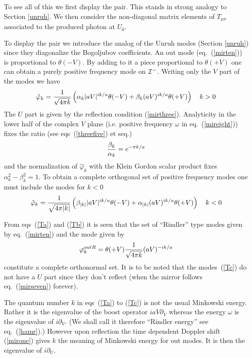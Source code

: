 \documentclass[12pt,oneside]{report}
\def\om{\omega	}
\begin{document}
To see all of this we first display the pair. This stands in strong analogy to
Section \ref{unruh}. We then consider the non-diagonal matrix elements of $
T_{\mu \nu}$ associated to the produced photon at $U_0$.

To display the pair we introduce the analog of the
Unruh modes (Section \ref{unruh}) since they diagonalize the Bogoljubov
coefficients. An out mode (eq.~(\ref{mirten})) is proportional to
$\theta(-V)$. By adding to it a piece proportional to $\theta(+V)$ one can
obtain a purely positive frequency mode on ${\cal I}^-$. Writing only the $V$ 
part of the modes we have
\begin{equation}
\hat \varphi_k = {1 \over \sqrt{4 \pi k}} \left(
\alpha_k \vert a V \vert^{i k/a} \theta(-V) +
\beta_k ( a V )^{i k/a} \theta(+V)
\right)
\quad k>0
\label{Ta}
\end{equation}
The $U$ part is given by the reflection condition (\ref{mirthree}).
Analyticity in the lower half of the complex $V$ plane (i.e.
positive frequency $\om$ in eq.~(\ref{mireight})) 
fixes the ratio (see eqs~(\ref{threefive}) et seq.)
\begin{equation}
 { \beta_k \over \alpha_k} = e^{-\pi k/a}
\label{Taa}
\end{equation}
and the normalization of $\hat \varphi_k$ with the Klein Gordon scalar product fixes
$\alpha_k^2 -\beta_k^2 =1$. To obtain a complete orthogonal set of positive
frequency modes one must include the modes for $k<0$
\begin{equation}
\hat \varphi_k = {1 \over \sqrt{4 \pi \vert k\vert}} \left(
\beta_{\vert k\vert} \vert a V \vert^{i k/a} \theta(-V) +
\alpha_{\vert k\vert} ( a V )^{i k/a} \theta(+V)
\right)
\quad k<0
\label{Tb}
\end{equation}

\par From eqs~(\ref{Ta}) and (\ref{Tb}) it is seen that the set of
``Rindler'' type modes given by eq.~(\ref{mirten}) and the mode given by
\begin{equation}
\varphi_k^{out  R} = \theta(+V)
{1 \over \sqrt{4 \pi k}} ( a V )^{-i k/a} 
\label{Tc}
\end{equation}
constitute a complete orthonormal set. It is to be noted that the
modes~(\ref{Tc}) do not have a $U$ part since they don't reflect (when the mirror
follows eq.~(\ref{mirseven}) forever).

The quantum number $k$ in eqs~(\ref{Ta}) to (\ref{Tc}) is not the usual
Minkowski energy. Rather it is the eigenvalue of the boost operator $i a V
\partial_V$ whereas the  energy $\om$ 
is the eigenvalue of $i\partial_V$. (We shall
call it therefore ``Rindler energy'' see eq.~(\ref{hamr}).)
 However upon reflection the time dependent Doppler shift
(\ref{mirone}) gives $k$ the meaning of Minkowski energy for out modes. 
It is then the
eigenvalue of $i\partial_U$. 
\end{document}
